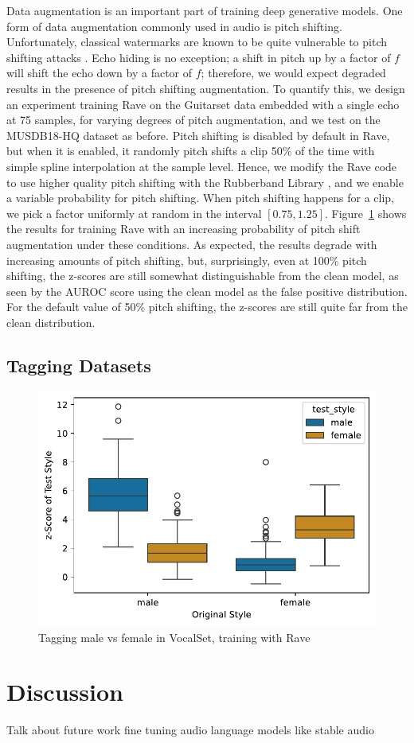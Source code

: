 \documentclass[letterpaper]{article} %
\begin{document}
Data augmentation is an important part of training deep generative models.  One form of data augmentation commonly used in audio is pitch shifting.  Unfortunately, classical watermarks are known to be quite vulnerable to pitch shifting attacks \cite{hu2014variable}.  Echo hiding is no exception; a shift in pitch up by a factor of $f$ will shift the echo down by a factor of $f$; therefore, we would expect degraded results in the presence of pitch shifting augmentation.  To quantify this, we design an experiment training Rave on the Guitarset data embedded with a single echo at 75 samples, for varying degrees of pitch augmentation, and we test on the MUSDB18-HQ dataset as before.  Pitch shifting is disabled by default in Rave, but when it is enabled, it randomly pitch shifts a clip 50\% of the time with simple spline interpolation at the sample level.  Hence, we modify the Rave code to use higher quality pitch shifting with the Rubberband Library \cite{cannam2024pyrubberband}, and we enable a variable probability for pitch shifting.  When pitch shifting happens for a clip, we pick a factor uniformly at random in the interval $[0.75, 1.25]$.  Figure~\ref{fig:pitchshiftaugmentation} shows the results for training Rave with an increasing probability of pitch shift augmentation under these conditions.  As expected, the results degrade with increasing amounts of pitch shifting, but, surprisingly, even at 100\% pitch shifting, the z-scores are still somewhat distinguishable from the clean model, as seen by the AUROC score using the clean model as the false positive distribution.  For the default value of 50\% pitch shifting, the z-scores are still quite far from the clean distribution.

\subsection{Tagging Datasets}

\begin{figure}
    \centering
    \includegraphics[width=\columnwidth]{figs/Rave_Tagging_MaleFemale.pdf}
    \caption{Tagging male vs female in VocalSet, training with Rave}
    \label{fig:pitchshiftaugmentation}
\end{figure}




\section{Discussion}
Talk about future work fine tuning audio language models like stable audio



\end{document}
